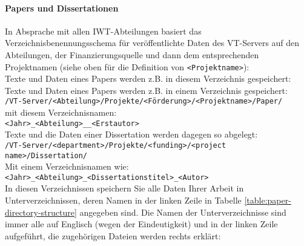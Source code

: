 \paragraph{Papers und Dissertationen}

\noindent In Absprache mit allen IWT-Abteilungen basiert das
Verzeichnisbenennungsschema für veröffentlichte Daten des VT-Servers auf den
Abteilungen, der Finanzierungsquelle und dann dem entsprechenden Projektnamen
(siehe oben für die Definition von \texttt{<Projektname>}): \\
Texte und Daten eines Papers werden z.B. in diesem Verzeichnis gespeichert:
\\
Texte und Daten eines Papers werden z.B. in einem Verzeichnis gespeichert:  \\
\texttt{/VT-Server/<Abteilung>/Projekte/<Förderung>/<Projektname>/Paper/} \\
mit diesem Verzeichnisnamen:
\\
\texttt{<Jahr>\_<Abteilung>\_<Paper-Name>\_<Erstautor> } \\
Texte und die Daten einer Dissertation werden dagegen so
abgelegt:
\\
\texttt{/VT-Server/<department>/Projekte/<funding>/<project name>/Dissertation/} \\
Mit einem Verzeichnisnamen wie:
\\
\texttt{<Jahr>\_<Abteilung>\_<Dissertationstitel>\_<Autor>} \\
In diesen Verzeichnissen speichern Sie alle Daten Ihrer Arbeit in
Unterverzeichnissen, deren Namen in der linken Zeile in
Tabelle \ref{table:paper-directory-structure} angegeben sind. Die Namen
der Unterverzeichnisse sind immer alle auf Englisch (wegen der Eindeutigkeit)
und in der linken Zeile aufgeführt, die zugehörigen Dateien werden rechts
erklärt:
\begin{table}[!h]
 
  \caption{%
  Die Daten jeder Arbeit müssen in acht Unterverzeichnissen gespeichert werden;
  weitere Hinweise: \\
  **Wenn die Arbeit druckreif ist, lädt der korrespondierende Autor die letzte
  und überarbeitete Version (d.h. nur die tatsächlich verwendeten, aber absolut
  vollständigen Daten) in das geschützte Verzeichnis \\
  ***Wenn die in einer Abbildung/Tabelle wiedergegebenen Daten aus verteilten
  Primärdatenverzeichnissen stammen, genügt es, hier nur das erzeugende Programm
  zu speichern%
  }
\label{table:paper-directory-structure}
\end{table}

